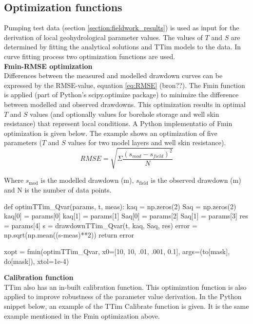 \subsection{Optimization functions}
Pumping test data (section \ref{section:fieldwork_results}) is used as input for the derivation of local geohydrological parameter values. The values of $T$ and $S$ are determined by fitting the analytical solutions and TTim models to the data. In curve fitting process two optimization functions are used. \\

\textbf{Fmin-RMSE optimization}\\
Differences between the measured and modelled drawdown curves can be expressed by the RMSE-value, equation \ref{eq:RMSE} (bron??). The Fmin function is applied (part of Python's scipy.optimize package) to minimize the difference between modelled and observed drawdowns. This optimization results in optimal $T$ and $S$ values (and optionally values for borehole storage and well skin resistance) that represent local conditions. A Python implementatio of Fmin optimization is given below. The example shows an optimization of five parameters ($T$ and $S$ values for two model layers and well skin resistance). \\ 

\begin{equation}
\label{eq:RMSE}
 RMSE = \sqrt{\Sigma\frac{(s_{mod}-s_{field})^{2}}{N}}
\end{equation}

Where $s_{\text{mod}}$ is the modelled drawdown (m), $s_{\text{field}}$ is the observed drawdown (m) and N is the number of data points. \\
 
\begin{python}[h!]
def optimTTim_Qvar(params, t, meas):
    kaq = np.zeros(2)
    Saq = np.zeros(2)
    kaq[0] = params[0]             
    kaq[1] = params[1]
    Saq[0] = params[2]
    Saq[1] = params[3]
    res = params[4]
    s = drawdownTTim_Qvar(t, kaq, Saq, res)
    error = np.sqrt(np.mean((s-meas)**2)) 
    return error

xopt = fmin(optimTTim_Qvar, x0=[10, 10, .01, .001, 0.1], args=(to[mask], do[mask]), xtol=1e-4)
\end{python}
\bigskip

\textbf{Calibration function}\\
TTim also has an in-built calibration function. This optimization function is also applied to improve robustness of the parameter value derivation. In the Python snippet below, an example of the TTim Calibrate function is given. It is the same example mentioned in the Fmin optimization above.\\ 

